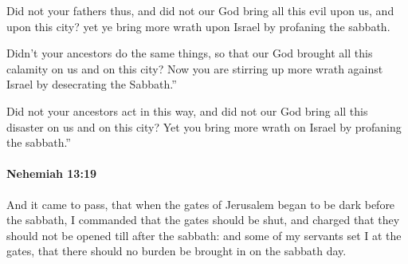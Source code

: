 			\begin{versebox}
					\item[BHS] 
					\item[LXX] 
					\item[ASV] Did not your fathers thus, and did not our God bring all this evil upon us, and upon this city? yet ye bring more wrath upon Israel by profaning the sabbath.
					\item[NIV] Didn’t your ancestors do the same things, so that our God brought all this calamity on us and on this city? Now you are stirring up more wrath against Israel by desecrating the Sabbath.”
					\item[NRSV] Did not your ancestors act in this way, and did not our God bring all this disaster on us and on this city? Yet you bring more wrath on Israel by profaning the sabbath.”
			\end{versebox}

		\paragraph{Nehemiah 13:19} %
			\label{NEHEMIAH-13-19}

			And it came to pass, that when the gates of Jerusalem began to be dark before the sabbath, I commanded that the gates should be shut, and charged that they should not be opened till after the sabbath: and some of my servants set I at the gates, that there should no burden be brought in on the sabbath day.


